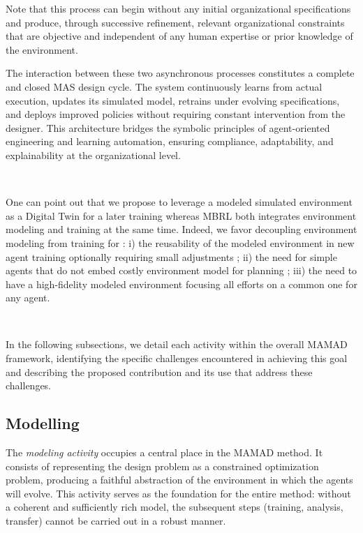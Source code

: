 \documentclass[pdflatex,sn-mathphys-num]{sn-jnl}%
\theoremstyle{thmstyleone}%
\theoremstyle{thmstyletwo}%
\theoremstyle{thmstylethree}%
\begin{document}
Note that this process can begin without any initial organizational specifications and produce, through successive refinement, relevant organizational constraints that are objective and independent of any human expertise or prior knowledge of the environment.

\noindent The interaction between these two asynchronous processes constitutes a complete and closed MAS design cycle. The system continuously learns from actual execution, updates its simulated model, retrains under evolving specifications, and deploys improved policies without requiring constant intervention from the designer. This architecture bridges the symbolic principles of agent-oriented engineering and learning automation, ensuring compliance, adaptability, and explainability at the organizational level.

\

\noindent One can point out that we propose to leverage a modeled simulated environment as a Digital Twin for a later training whereas MBRL both integrates environment modeling and training at the same time. Indeed, we favor decoupling environment modeling from training for : i) the reusability of the modeled environment in new agent training optionally requiring small adjustments ; \quad ii) the need for simple agents that do not embed costly environment model for planning ; \quad iii) the need to have a high-fidelity modeled environment focusing all efforts on a common one for any agent.

\

\noindent In the following subsections, we detail each activity within the overall MAMAD framework, identifying the specific challenges encountered in achieving this goal and describing the proposed contribution and its use that address these challenges.

\subsection{Modelling}\label{sec:modelling}

The \textit{modeling activity} occupies a central place in the MAMAD method.
It consists of representing the design problem as a constrained optimization problem, producing a faithful abstraction of the environment in which the agents will evolve.
This activity serves as the foundation for the entire method: without a coherent and sufficiently rich model, the subsequent steps (training, analysis, transfer) cannot be carried out in a robust manner.
\end{document}

